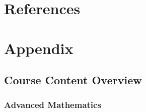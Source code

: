 \documentclass[8pt]{extarticle}
\begin{document}
\section{References}
\printbibliography[heading=none]

\pagebreak

\section{Appendix}
\subsection{Course Content Overview}
\subsubsection{Advanced Mathematics}
\end{document}
